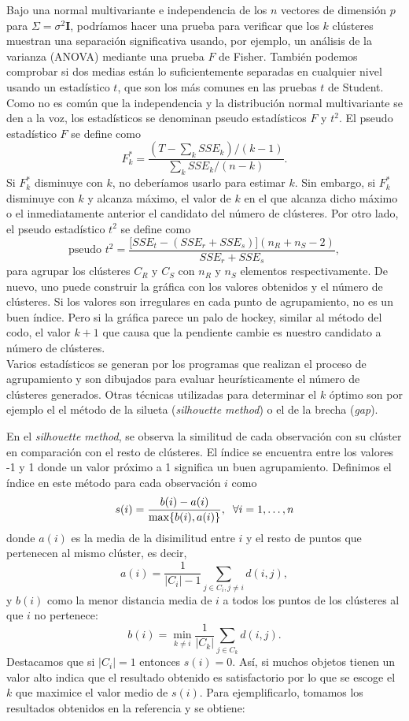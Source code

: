 \documentclass[a4paper, 20pt]{article}
\begin{document}
{Bajo una normal multivariante e independencia de los $ n $ vectores de dimensión $ p $ para $ \Sigma = \sigma^2 \textbf{I} $, podríamos hacer una prueba para verificar que los $ k $ clústeres muestran una separación significativa usando, por ejemplo, un análisis de la varianza (ANOVA) mediante una prueba $ F $ de Fisher. También podemos comprobar si dos medias están lo suficientemente separadas en cualquier nivel usando un estadístico $ t $, que son los más comunes en las pruebas $ t $ de Student. Como no es común que la independencia y la distribución normal multivariante se den a la voz, los estadísticos se denominan pseudo estadísticos $ F $ y  $ t^2 $. El pseudo estadístico $ F $ se define como
\[
F^*_k = \frac{(T-\sum_k SSE_k) / (k-1)}{\sum_k SSE_k / (n-k)}.
\]
Si $ F^*_k $ disminuye con $ k $, no deberíamos usarlo para estimar $ k $. Sin embargo, si $ F^*_k $ disminuye con $ k $ y alcanza máximo, el valor de $ k $ en el que alcanza dicho máximo o el inmediatamente anterior el candidato del número de clústeres. Por otro lado, el pseudo estadístico $ t^2 $ se define como
\[
\text{pseudo }t^2 = \frac{\lbrack SSE_t - (SSE_r + SSE_s)\rbrack(n_R + n_S - 2)}{SSE_r + SSE_s},
\]
para agrupar los clústeres $ C_R $ y $ C_S $ con $ n_R $ y $ n_S $ elementos respectivamente. De nuevo, uno puede construir la gráfica con los valores obtenidos y el número de clústeres. Si los valores son irregulares en cada punto de agrupamiento, no es un buen índice. Pero si la gráfica parece un palo de hockey, similar al método del codo, el valor $ k +1 $ que causa que la pendiente cambie es nuestro candidato a número de clústeres. \\

Varios estadísticos se generan por los programas que realizan el proceso de agrupamiento y son dibujados para evaluar heurísticamente el número de clústeres generados. Otras técnicas utilizadas para determinar el $ k $ óptimo son por ejemplo el el método de la silueta (\textit{silhouette method}) o el de la brecha (\textit{gap}).

En el \textit{silhouette method}, se observa la similitud de cada observación con su clúster en comparación con el resto de clústeres. El índice se encuentra entre los valores -1 y 1 donde un valor próximo a 1 significa un buen agrupamiento. Definimos el índice en este método para cada observación $ i $ como
\[
s(i) = \frac{b(i)-a(i)}{\max\{b(i), a(i)\}}, \hspace{2mm} \forall i = 1, \dots, n
\] 
donde $ a(i) $ es la media de la disimilitud entre $ i $ y el resto de puntos que pertenecen al mismo clúster, es decir,
\[
a(i) = \frac{1}{|C_i|-1}\sum_{j\in C_i, j \neq i} d(i,j),
\]
y $ b(i) $ como la menor distancia media de $ i $ a todos los puntos de los clústeres al que $ i $ no pertenece:
\[
b(i) = \min_{k \neq i} \frac{1}{|C_k|} \sum_{j \in C_k} d(i,j).
\] 
Destacamos que si $ |C_i| = 1 $ entonces $ s(i) = 0 $. Así, si muchos objetos tienen un valor alto indica que el resultado obtenido es satisfactorio por lo que se escoge el $ k $ que maximice el valor medio de $ s(i) $. Para ejemplificarlo, tomamos los resultados obtenidos en la referencia \cite{silouetteGraph} y se obtiene:

}
\end{document}
